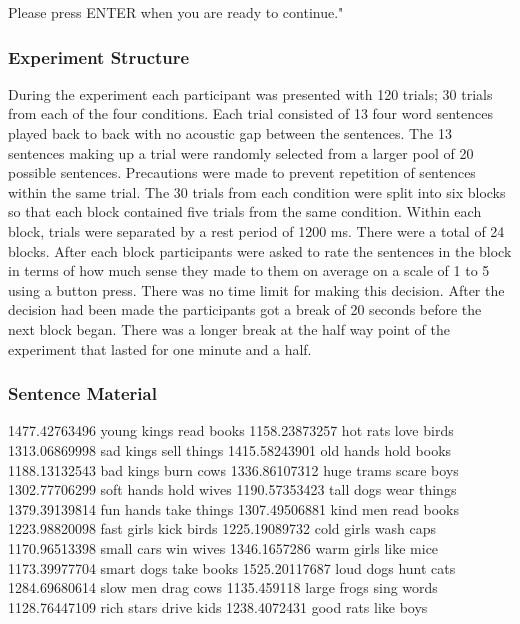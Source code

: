 \documentclass[10pt,letterpaper]{article}
\begin{document}
Please press ENTER when you are ready to continue."

\subsubsection{Experiment Structure}

During the experiment each participant was presented with 120 trials; 30 trials from each of the four conditions. Each trial consisted of 13 four word sentences played back to back with no acoustic gap between the sentences. The 13 sentences making up a trial were randomly selected from a larger pool of 20 possible sentences. Precautions were made to prevent repetition of sentences within the same trial. The 30 trials from each condition were split into six blocks so that each block contained five trials from the same condition. Within each block, trials were separated by a rest period of 1200 ms. There were a total of 24 blocks. After each block participants were asked to rate the sentences in the block in terms of how much sense they made to them on average on a scale of 1 to 5 using a button press. There was no time limit for making this decision. After the decision had been made the participants got a break of 20 seconds before the next block began. There was a longer break at the half way point of the experiment that lasted for one minute and a half. 

\subsubsection{Sentence Material}


1477.42763496	young kings read books
1158.23873257	hot rats love birds 
1313.06869998	sad kings sell things
1415.58243901	old hands hold books
1188.13132543	bad kings burn cows 
1336.86107312	huge trams scare boys
1302.77706299	soft hands hold wives 
1190.57353423	tall dogs wear things
1379.39139814	fun hands take things 
1307.49506881	kind men read books
1223.98820098	fast girls kick birds 
1225.19089732	cold girls wash caps
1170.96513398	small cars win wives 
1346.1657286	warm girls like mice
1173.39977704	smart dogs take books 
1525.20117687	loud dogs hunt cats 
1284.69680614	slow men drag cows 
1135.459118	large frogs sing words
1128.76447109	rich stars drive kids
1238.4072431	good rats like boys

\end{document}
